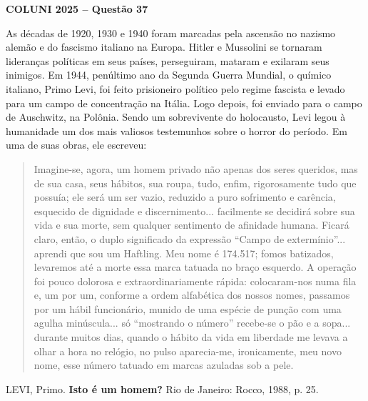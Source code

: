 \textbf{COLUNI 2025 -- Questão 37}\par\medskip As décadas de 1920, 1930 e 1940 foram marcadas pela ascensão no nazismo alemão e do fascismo italiano na Europa. Hitler e Mussolini se tornaram lideranças políticas em seus países, perseguiram, mataram e exilaram seus inimigos. Em 1944, penúltimo ano da Segunda Guerra Mundial, o químico italiano, Primo Levi, foi feito prisioneiro político pelo regime fascista e levado para um campo de concentração na Itália. Logo depois, foi enviado para o campo de Auschwitz, na Polônia. Sendo um sobrevivente do holocausto, Levi legou à humanidade um dos mais valiosos testemunhos sobre o horror do período. Em uma de suas obras, ele escreveu:

\par

\begin{quote}
Imagine-se, agora, um homem privado não apenas dos seres queridos, mas de sua casa, seus hábitos, sua roupa, tudo, enfim, rigorosamente tudo que possuía; ele será um ser vazio, reduzido a puro sofrimento e carência, esquecido de dignidade e discernimento... facilmente se decidirá sobre sua vida e sua morte, sem qualquer sentimento de afinidade humana. Ficará claro, então, o duplo significado da expressão “Campo de extermínio”... aprendi que sou um Haftling. Meu nome é 174.517; fomos batizados, levaremos até a morte essa marca tatuada no braço esquerdo. A operação foi pouco dolorosa e extraordinariamente rápida: colocaram-nos numa fila e, um por um, conforme a ordem alfabética dos nossos nomes, passamos por um hábil funcionário, munido de uma espécie de punção com uma agulha minúscula... só “mostrando o número” recebe-se o pão e a sopa... durante muitos dias, quando o hábito da vida em liberdade me levava a olhar a hora no relógio, no pulso aparecia-me, ironicamente, meu novo nome, esse número tatuado em marcas azuladas sob a pele.
\end{quote}
\begin{flushright}LEVI, Primo. \textbf{Isto é um homem?} Rio de Janeiro: Rocco, 1988, p. 25.\end{flushright}

\par


